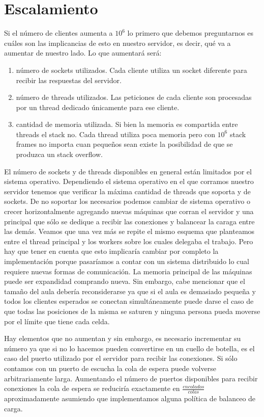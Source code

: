 \section{Escalamiento}
Si el número de clientes aumenta a $10^6$ lo primero que debemos preguntarnos es cuáles
son las implicancias de esto en nuestro servidor, es decir, qué va a aumentar de nuestro
lado. Lo que aumentará será:
\begin{enumerate}
  \item número de sockets utilizados. Cada cliente utiliza un socket diferente para
    recibir las respuestas del servidor.
  \item número de threads utilizados. Las peticiones de cada cliente son procesadas
    por un thread dedicado únicamente para ese cliente.
  \item cantidad de memoria utilizada. Si bien la memoria es compartida entre threads
    el stack no. Cada thread utiliza poca memoria pero con $10^6$ stack frames no
    importa cuan pequeños sean existe la posibilidad de que se produzca un
    stack overflow.
\end{enumerate}
El número de sockets y de threads disponibles en general están limitados por el sistema
operativo. Dependiendo el sistema operativo en el que corramos nuestro servidor
tenemos que verificar la máxima cantidad de threads que soporta y de sockets. De no
soportar los necesarios podemos cambiar de sistema operativo o crecer horizontalmente
agregando nuevas máquinas que corran el servidor y una principal que sólo se dedique
a recibir las conexiones y balancear la caraga entre las demás. Veamos que una vez más se
repite el mismo esquema que planteamos entre el thread principal y los workers sobre los
cuales delegaba el trabajo. Pero hay que tener en cuenta que esto implicaría cambiar
por completo la implementación porque pasaríamos a contar con un sistema distribuido lo cual
requiere nuevas formas de comunicación. La memoria principal de las máquinas puede ser
expandidad comprando nueva. Sin embargo, cabe mencionar que el tamaño del aula debería
reconsiderarse ya que si el aula es demasiado pequeña y todos los clientes esperados
se conectan simultáneamente puede darse el caso de que todas las posiciones de la 
misma se saturen y ninguna persona pueda moverse por el límite que tiene cada celda.

Hay elementos que no aumentan y sin embargo, es necesario incrementar su número ya que
si no lo hacemos pueden convertirse en un cuello de botella, es el caso del puerto 
utilizado por el servidor para recibir las conexiones. Si sólo contamos con un puerto
de escucha la cola de espera puede volverse arbitrariamente larga. 
Aumentando el número de puertos disponibles para recibir conexiones la cola de espera 
se reduciría exactamente en $\frac{encolados}{colas}$ aproximadamente asumiendo que 
implementamos alguna política de balanceo de carga.

